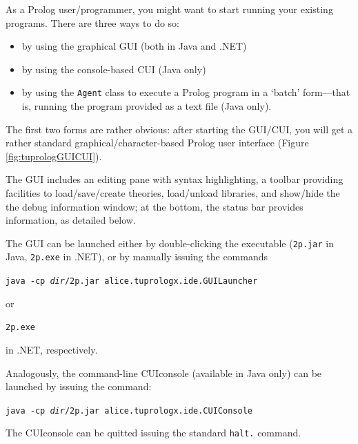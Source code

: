 As a Prolog user/programmer, you might want to start running your existing programs.
%
There are three ways to do so:
\begin{itemize}
  \item by using the graphical \tuprolog{} GUI (both in Java and .NET)
  \item by using the console-based \tuprolog{} CUI  (Java only)
  \item by using the \texttt{Agent} class to execute a Prolog program in a `batch' form---that is, running the program provided as a text file (Java only).
\end{itemize}

The first two forms are rather obvious: after starting the GUI/CUI, you will get a rather standard graphical/character-based Prolog user interface (Figure \ref{fig:tuprologGUICUI}).

The GUI includes an editing pane with syntax highlighting, a toolbar providing facilities to load/save/create theories, load/unload libraries, and show/hide the the debug information window; at the bottom, the status bar provides information, as detailed below.

The GUI can be launched either by double-clicking the \tuprolog{} executable (\texttt{2p.jar} in Java, \texttt{2p.exe} in .NET), or by manually issuing the commands

\texttt{java -cp \emph{dir}/2p.jar alice.tuprologx.ide.GUILauncher}

\noindent or

\texttt{2p.exe}

\noindent in .NET, respectively.

Analogously, the command-line CUIconsole (available in Java only) can be launched by issuing the command:

\texttt{java -cp \emph{dir}/2p.jar alice.tuprologx.ide.CUIConsole}

\noindent The CUIconsole can be quitted issuing the standard \texttt{halt.} command.


